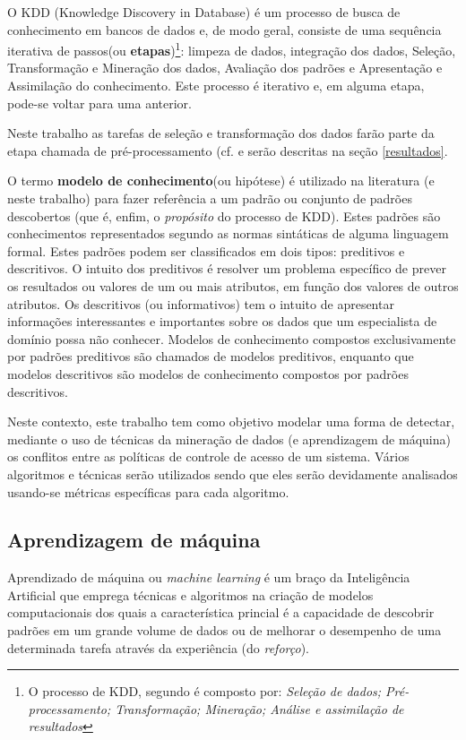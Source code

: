 O KDD (Knowledge Discovery in Database) é um processo de busca de conhecimento em bancos de dados e, de modo geral, consiste de uma sequência iterativa de passos(ou \textbf{etapas})\footnote{O processo de KDD, segundo \cite{fayyad1996} é composto por: \textit{Seleção de dados; Pré-processamento; Transformação; Mineração; Análise e assimilação de resultados}}: limpeza de dados, integração dos dados, Seleção, Transformação e Mineração dos dados, Avaliação dos padrões e Apresentação e Assimilação do conhecimento. Este processo é iterativo e, em alguma etapa, pode-se voltar para uma anterior. \cite{Boscarioli2017}

Neste trabalho as tarefas de seleção e transformação dos dados farão parte da etapa chamada de pré-processamento (cf. \cite{Boscarioli2017} e serão descritas na seção \ref{resultados}.

O termo \textbf{modelo de conhecimento}(ou hipótese) é utilizado na literatura (e neste trabalho) para fazer referência a um padrão ou conjunto de padrões descobertos (que é, enfim, o \textit{propósito} do processo de KDD). Estes padrões são conhecimentos representados segundo as normas sintáticas de alguma linguagem formal. Estes padrões podem ser classificados em dois tipos: preditivos e descritivos. O intuito dos preditivos é resolver um problema específico de prever os resultados ou valores de um ou mais atributos, em função dos valores de outros atributos. Os descritivos (ou informativos) tem o intuito de apresentar informações interessantes e importantes sobre os dados que um especialista de domínio possa não conhecer. Modelos de conhecimento compostos exclusivamente por padrões preditivos são chamados de modelos preditivos, enquanto que modelos descritivos são modelos de conhecimento compostos por padrões descritivos. \cite{goldschmidt2005}\cite{ferrari2017}\cite{Boscarioli2017}

Neste contexto, este trabalho tem como objetivo modelar uma forma de detectar, mediante o uso de técnicas da mineração de dados (e aprendizagem de máquina) os conflitos entre as políticas de controle de acesso de um sistema. Vários algoritmos e técnicas serão utilizados sendo que eles serão devidamente analisados usando-se métricas específicas para cada algoritmo.

\subsection{Aprendizagem de máquina} \label{aprendizagem_maquina}
Aprendizado de máquina ou \textit{machine learning} é um braço da Inteligência Artificial que emprega técnicas e algoritmos na criação de modelos computacionais dos quais a característica princial é a capacidade de descobrir padrões em um grande volume de dados ou de melhorar o desempenho de uma determinada tarefa através da experiência (do \textit{reforço}).\cite{mohri_foundations_2018} \cite{alpaydin_introduction_2014} \cite{swamynathan_mastering_2019}

